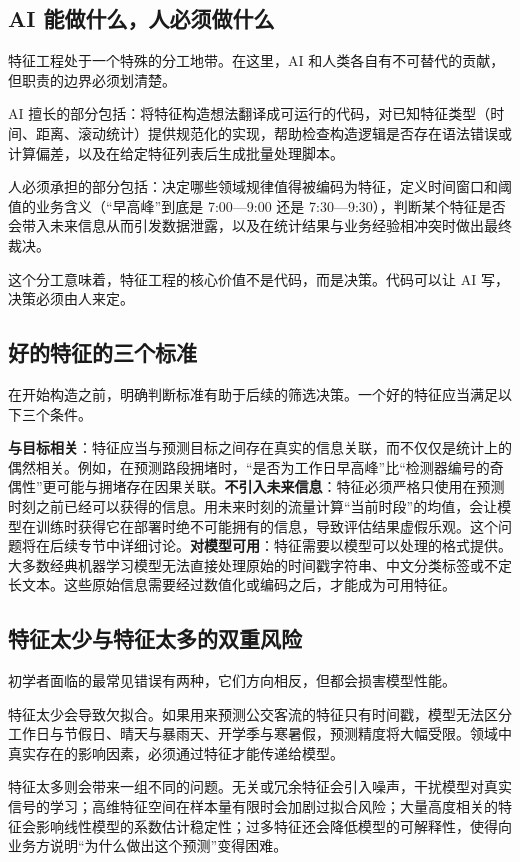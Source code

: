 \subsection{AI 能做什么，人必须做什么}

特征工程处于一个特殊的分工地带。在这里，AI 和人类各自有不可替代的贡献，但职责的边界必须划清楚。

AI 擅长的部分包括：将特征构造想法翻译成可运行的代码，对已知特征类型（时间、距离、滚动统计）提供规范化的实现，帮助检查构造逻辑是否存在语法错误或计算偏差，以及在给定特征列表后生成批量处理脚本。

人必须承担的部分包括：决定哪些领域规律值得被编码为特征，定义时间窗口和阈值的业务含义（“早高峰”到底是 7:00—9:00 还是 7:30—9:30），判断某个特征是否会带入未来信息从而引发数据泄露，以及在统计结果与业务经验相冲突时做出最终裁决。

这个分工意味着，特征工程的核心价值不是代码，而是决策。代码可以让 AI 写，决策必须由人来定。

\subsection{好的特征的三个标准}

在开始构造之前，明确判断标准有助于后续的筛选决策。一个好的特征应当满足以下三个条件。

\textbf{与目标相关}：特征应当与预测目标之间存在真实的信息关联，而不仅仅是统计上的偶然相关。例如，在预测路段拥堵时，“是否为工作日早高峰”比“检测器编号的奇偶性”更可能与拥堵存在因果关联。\textbf{不引入未来信息}：特征必须严格只使用在预测时刻之前已经可以获得的信息。用未来时刻的流量计算“当前时段”的均值，会让模型在训练时获得它在部署时绝不可能拥有的信息，导致评估结果虚假乐观。这个问题将在后续专节中详细讨论。\textbf{对模型可用}：特征需要以模型可以处理的格式提供。大多数经典机器学习模型无法直接处理原始的时间戳字符串、中文分类标签或不定长文本。这些原始信息需要经过数值化或编码之后，才能成为可用特征。

\subsection{特征太少与特征太多的双重风险}

初学者面临的最常见错误有两种，它们方向相反，但都会损害模型性能。

特征太少会导致欠拟合。如果用来预测公交客流的特征只有时间戳，模型无法区分工作日与节假日、晴天与暴雨天、开学季与寒暑假，预测精度将大幅受限。领域中真实存在的影响因素，必须通过特征才能传递给模型。

特征太多则会带来一组不同的问题。无关或冗余特征会引入噪声，干扰模型对真实信号的学习；高维特征空间在样本量有限时会加剧过拟合风险；大量高度相关的特征会影响线性模型的系数估计稳定性；过多特征还会降低模型的可解释性，使得向业务方说明“为什么做出这个预测”变得困难。

